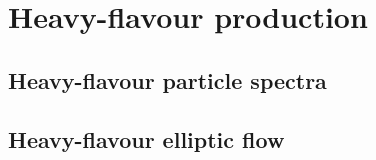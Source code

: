\section{Heavy-flavour production}
\label{secks:heavy}
\subsection{Heavy-flavour particle spectra}
\label{subsecks:heavyspectra}
\subsection{Heavy-flavour elliptic flow}
\label{subsecks:heavyflow}

